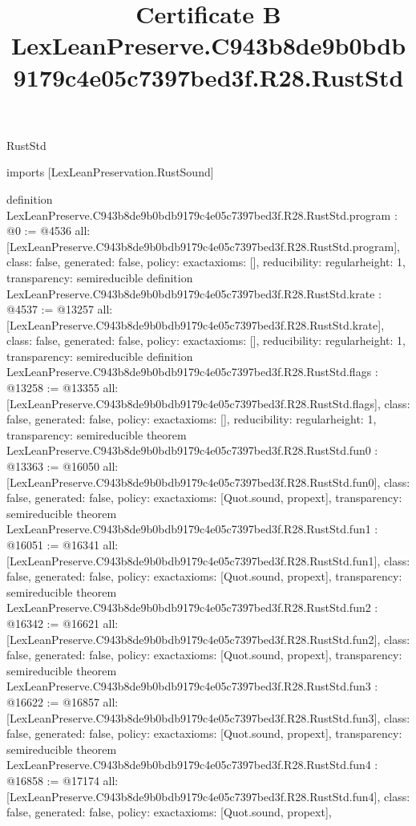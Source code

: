 \begin{lexlean}{RustStd}
\title{Certificate B LexLeanPreserve.C943b8de9b0bdb9179c4e05c7397bed3f.R28.RustStd}
\begin{coremodule}
imports [LexLeanPreservation.RustSound]

definition LexLeanPreserve.C943b8de9b0bdb9179c4e05c7397bed3f.R28.RustStd.program : @0 := @4536 {
  all: [LexLeanPreserve.C943b8de9b0bdb9179c4e05c7397bed3f.R28.RustStd.program],
  class: false,
  generated: false,
  policy: exact{axioms: []},
  reducibility: regular{height: 1},
  transparency: semireducible
}
definition LexLeanPreserve.C943b8de9b0bdb9179c4e05c7397bed3f.R28.RustStd.krate : @4537 := @13257 {
  all: [LexLeanPreserve.C943b8de9b0bdb9179c4e05c7397bed3f.R28.RustStd.krate],
  class: false,
  generated: false,
  policy: exact{axioms: []},
  reducibility: regular{height: 1},
  transparency: semireducible
}
definition LexLeanPreserve.C943b8de9b0bdb9179c4e05c7397bed3f.R28.RustStd.flags : @13258 := @13355 {
  all: [LexLeanPreserve.C943b8de9b0bdb9179c4e05c7397bed3f.R28.RustStd.flags],
  class: false,
  generated: false,
  policy: exact{axioms: []},
  reducibility: regular{height: 1},
  transparency: semireducible
}
theorem LexLeanPreserve.C943b8de9b0bdb9179c4e05c7397bed3f.R28.RustStd.fun0 : @13363 := @16050 {
  all: [LexLeanPreserve.C943b8de9b0bdb9179c4e05c7397bed3f.R28.RustStd.fun0],
  class: false,
  generated: false,
  policy: exact{axioms: [Quot.sound, propext]},
  transparency: semireducible
}
theorem LexLeanPreserve.C943b8de9b0bdb9179c4e05c7397bed3f.R28.RustStd.fun1 : @16051 := @16341 {
  all: [LexLeanPreserve.C943b8de9b0bdb9179c4e05c7397bed3f.R28.RustStd.fun1],
  class: false,
  generated: false,
  policy: exact{axioms: [Quot.sound, propext]},
  transparency: semireducible
}
theorem LexLeanPreserve.C943b8de9b0bdb9179c4e05c7397bed3f.R28.RustStd.fun2 : @16342 := @16621 {
  all: [LexLeanPreserve.C943b8de9b0bdb9179c4e05c7397bed3f.R28.RustStd.fun2],
  class: false,
  generated: false,
  policy: exact{axioms: [Quot.sound, propext]},
  transparency: semireducible
}
theorem LexLeanPreserve.C943b8de9b0bdb9179c4e05c7397bed3f.R28.RustStd.fun3 : @16622 := @16857 {
  all: [LexLeanPreserve.C943b8de9b0bdb9179c4e05c7397bed3f.R28.RustStd.fun3],
  class: false,
  generated: false,
  policy: exact{axioms: [Quot.sound, propext]},
  transparency: semireducible
}
theorem LexLeanPreserve.C943b8de9b0bdb9179c4e05c7397bed3f.R28.RustStd.fun4 : @16858 := @17174 {
  all: [LexLeanPreserve.C943b8de9b0bdb9179c4e05c7397bed3f.R28.RustStd.fun4],
  class: false,
  generated: false,
  policy: exact{axioms: [Quot.sound, propext]},
}
\end{coremodule}
\end{lexlean}
